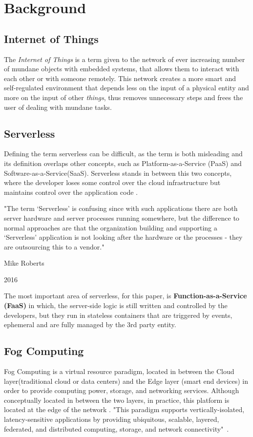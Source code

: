 \section{Background}

\subsection{Internet of Things}\label{sec:dialecto}
The \textit{Internet of Things} is a term given to the network of ever increasing
number of mundane objects with embedded systems, that allows them to interact with
each other or with someone remotely. This network creates a more smart and self-regulated environment that depends less on the input of a physical entity and more on the input of other \textit{things}, thus removes unnecessary steps and frees the user
of dealing with mundane tasks.

\subsection{Serverless}
Defining the term serverless can be difficult, as the term is both misleading and
its definition overlaps other concepts, such as Platform-as-a-Service (PaaS) and
Software-as-a-Service(SaaS). Serverless stands in between this two concepts, where
the developer loses some control over the cloud infrastructure but maintains
control over the application code \cite{kn:Baldini}.

"The term ‘Serverless’ is confusing since with such applications there are both
server hardware and server processes running somewhere, but the difference to
normal approaches are that the organization building and supporting a ‘Serverless’ application is not looking after the hardware or the processes - they are outsourcing this to a vendor." 

\hfill Mike Roberts

\hfill 2016

The most important area of serverless, for this paper, is
\textbf{Function-as-a-Service (FaaS)} in which, the server-side logic is still
written and controlled by the developers, but they run in stateless containers
that are triggered by events, ephemeral and are fully managed by the 3rd party
entity.

\subsection{Fog Computing}
Fog Computing is a virtual resource paradigm, located in between the Cloud
layer(traditional cloud or data centers) and the Edge layer (smart end devices) in
order to provide computing power, storage, and networking services. Although
conceptually located in between the two layers, in practice, this platform is located at the
edge of the network \cite{kn:Bonomi}. "This paradigm supports vertically-isolated,
latency-sensitive applications by providing ubiquitous, scalable, layered,
federated, and distributed computing, storage, and network connectivity"~\cite{kn:Iorga2017}. 


